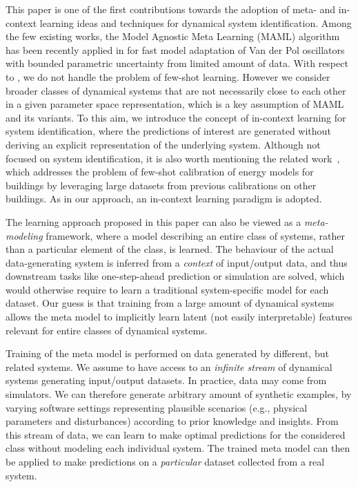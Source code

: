 \documentclass{article}
\begin{document}
This paper is one of the first contributions towards the
adoption of meta- and in-context learning ideas and techniques for dynamical system identification. Among the few existing works,
the Model Agnostic Meta Learning (MAML) algorithm~\cite{finn2017model}   has been recently applied in \cite{chakrabarty2023meta} for fast  model adaptation of Van der Pol oscillators with bounded parametric uncertainty from limited amount of data. 
With respect to \cite{chakrabarty2023meta}, we do not handle the problem of few-shot learning. However we consider  broader classes of dynamical systems that are not necessarily close to each other in a given parameter space representation, which is  a key assumption of MAML and its variants.  To this aim, we introduce the concept of in-context learning for system identification, where the predictions of interest are generated without deriving an explicit representation of the underlying system.  
%
  Although not focused on system identification, it is also worth mentioning the related work~\cite{zhan2022calibrating}, which addresses the problem of few-shot calibration of energy models for buildings by leveraging large datasets from previous calibrations on other buildings. As in our approach, an in-context learning paradigm is adopted.

  
The learning approach proposed in this paper can also be viewed as a \emph{meta-modeling} framework, where a model describing an entire class of  systems, rather than a particular element of the class, is learned. 
%
The behaviour of the actual data-generating system is  inferred from a \emph{context} of input/output data, and thus  downstream tasks like one-step-ahead prediction or simulation are solved, which would otherwise require to learn a traditional system-specific model for each dataset.   
% 
Our guess is that training from  a large amount of dynamical systems allows  the meta model to implicitly learn  latent (not easily interpretable) features relevant for entire classes of dynamical systems.  

Training of the meta model is performed on data generated by different, but related systems. We assume to have access to an \emph{infinite stream} of dynamical systems generating input/output  datasets. In practice,  data may come from  simulators. 
We can therefore generate arbitrary amount of synthetic examples, by varying software settings representing plausible scenarios (e.g., physical parameters and disturbances) according to prior knowledge and insights. From this stream of data, we can learn to make optimal predictions for the considered  class without modeling each individual system. The trained meta model can then be applied to make predictions on a \emph{particular} dataset collected from a real system.
 
\end{document}
